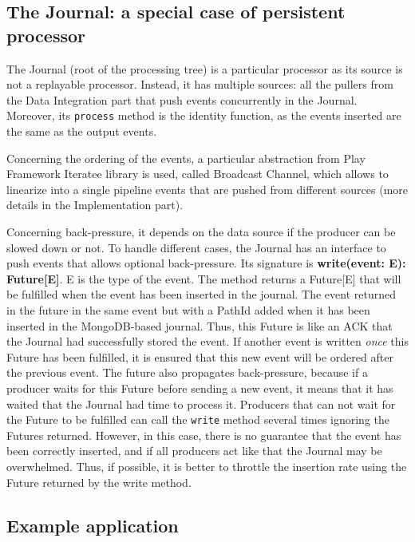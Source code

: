 \subsection{The Journal: a special case of persistent processor}

The Journal (root of the processing tree) is a particular processor as its source is not a replayable processor. Instead, it has multiple sources: all the pullers from the Data
Integration part that push events concurrently in the Journal. Moreover, its \verb|process| method is the identity function, as the events inserted are the same as the output events.

Concerning the ordering of the events, a particular abstraction from Play Framework Iteratee library is used, called Broadcast Channel, which allows to linearize into a single pipeline events that are pushed from different sources (more details in the Implementation part).

Concerning back-pressure, it depends on the data source if the producer can be slowed down or not. To handle different cases, the Journal has an interface to push events that allows optional back-pressure. Its signature is \textbf{write(event: E): Future[E]}. E is the type of the event. The method returns a Future[E] that will be fulfilled when the event has been inserted in the journal. The event returned in the future in the same event but with a PathId added when it has been inserted in the MongoDB-based journal.
Thus, this Future is like an ACK that the Journal had successfully stored the event. If another event is written \textit{once} this Future has been fulfilled, it is ensured
that this new event will be ordered after the previous event. The future also propagates back-pressure, because if a producer waits for this Future before sending a new event, it means that it has waited that the Journal had time to process it. Producers that can not wait for the Future to be fulfilled can call the \verb|write| method several times
ignoring the Futures returned. However, in this case, there is no guarantee that the event has been correctly inserted, and if all producers act like that the Journal may be overwhelmed. Thus, if possible, it is better to throttle the insertion rate using the Future returned by the write method.

\subsection{Example application}

